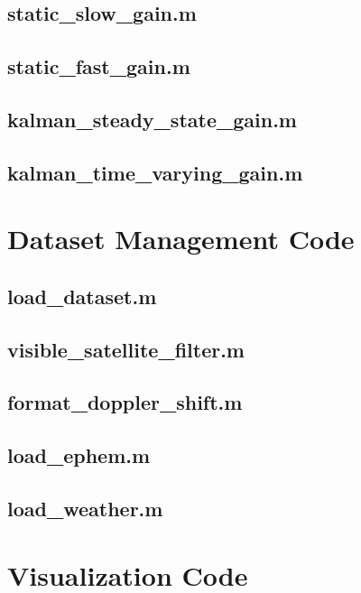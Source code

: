 \subsection{static\_slow\_gain.m}

\subsection{static\_fast\_gain.m}

\subsection{kalman\_steady\_state\_gain.m}

\subsection{kalman\_time\_varying\_gain.m}


\section{Dataset Management Code}
\subsection{load\_dataset.m}

\subsection{visible\_satellite\_filter.m}

\subsection{format\_doppler\_shift.m}

\subsection{load\_ephem.m}

\subsection{load\_weather.m}


\section{Visualization Code}
